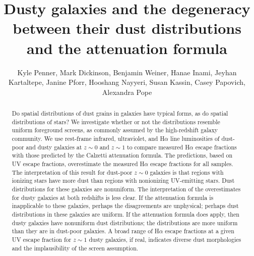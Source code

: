 \documentclass[preprint]{aastex}
\begin{document}
\title{Dusty galaxies and the degeneracy between their dust distributions and
the attenuation formula}

\author{Kyle Penner, Mark Dickinson,
Benjamin Weiner, Hanae Inami,
Jeyhan Kartaltepe, Janine Pforr,
Hooshang Nayyeri,
Susan Kassin,
Casey Papovich,
Alexandra Pope
}




\begin{abstract}
Do spatial distributions of dust grains in galaxies have typical forms, as do
spatial distributions of stars?  We investigate whether or not the distributions
resemble
uniform foreground screens, as commonly assumed by the high-redshift galaxy
community.  We use rest-frame infrared,
ultraviolet, and H$\alpha$ line luminosities of dust-poor and dusty galaxies
at $z \sim 0$ and $z \sim 1$ to compare measured H$\alpha$ escape fractions
with those predicted by the Calzetti attenuation formula.  The predictions,
based on
UV escape fractions, overestimate the measured H$\alpha$ escape fractions for
all samples.  The
interpretation of this result for dust-poor $z \sim 0$ galaxies is that regions
with ionizing stars have more dust than regions with nonionizing UV-emitting
stars.  Dust distributions for these galaxies are nonuniform.  The
interpretation of the overestimates for dusty galaxies at both redshifts is
less clear.  If the attenuation formula is inapplicable to these galaxies,
perhaps the disagreements are unphysical; perhaps dust distributions in
these galaxies are uniform.  If the attenuation formula does apply, then dusty
galaxies have nonuniform dust distributions; the distributions are more
uniform than they are in dust-poor galaxies.  A broad range of H$\alpha$ escape
fractions at a given UV escape fraction for $z \sim 1$ dusty galaxies, if real,
indicates diverse dust morphologies and the implausibility of the screen
assumption.
\end{abstract}
\end{document}
